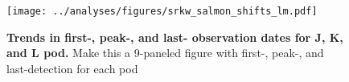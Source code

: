 \documentclass{article}
\begin{document}
 
 
\begin{figure}[p]
\texttt{[image: ../analyses/figures/srkw\_salmon\_shifts\_lm.pdf]} 
\caption{\textbf{Trends in first-, peak-, and last- observation dates for J, K, and L pod.} Make this a 9-paneled figure with first-, peak-, and last-detection for each pod}
 \label{fig:occupancy}
 \end{figure}



\end{document}

